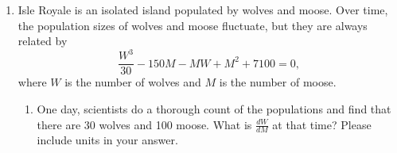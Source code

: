 \documentclass{article}
\begin{document}
\begin{enumerate}
\begin{enumerate}
    \begin{solution}
        As $x\to 0^+$, $x^3\to 0$ and $\ln(4x)\to -\infty$. This is a limit of the indeterminate form ``$0\cdot \infty$'', so we can rewrite it as a limit of the form ``$\dfrac{\infty}{\infty}$'' and use L'H\^{o}pital's rule.
        \begin{align*}
           \displaystyle \lim_{x \to 0^{+}} x^3 \cdot \ln(4x) &= \displaystyle \lim_{x \to 0^{+}} \dfrac{\ln(4x)}{x^{-3}}\\
           &\stackrel{\text{L'H}}{=} \displaystyle \lim_{x \to 0^{+}} \dfrac{\frac{1}{4x}\cdot 4}{-3x^{-4}}\\
           &= \displaystyle \lim_{x \to 0^{+}} \dfrac{x^3}{-3}\\
           &= \boxed{0}
        \end{align*}
    \end{solution}

    \vfill 

    \item $\displaystyle \lim_{x \to \infty} \dfrac{5\sin(x)}{x}$

    \begin{solution}
        As $x\to \infty$, $\sin x$ oscillates between $-1$ and $1$ so $5\sin x$ oscillates between $-5$ and $5$ in the numerator. The denominator goes to $\infty$, so the overall limit is $\boxed{0}$.
    \end{solution}
    \vfill 
    
  \end{enumerate}

  \probonly{\newpage}

\item \label{spring2011-mb-final-6}

Isle Royale is an isolated island populated by wolves and moose.  Over
  time, the population sizes of wolves and moose fluctuate, but they are
  always related by $$\frac{W^3}{30} - 150M - MW + M^2 + 7100 = 0,$$ where
  $W$ is the number of wolves and $M$ is the number of moose.
  \begin{enumerate}
  \item \label{spring2011-mb-final-6a}
    \begin{problem}[\vfill]
      One day, scientists do a thorough count of the populations and find
      that there are 30 wolves and 100 moose.  What is $\displaystyle
      \frac{dW}{dM}$ at that time?  Please include units in your answer.
    \end{problem}


\end{enumerate}
\end{enumerate}
\end{document}
